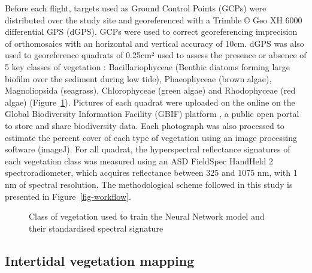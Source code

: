 \documentclass[
  number]{elsarticle}
\begin{document}
Before each flight, targets used as Ground Control Points (GCPs) were
distributed over the study site and georeferenced with a Trimble © Geo
XH 6000 differential GPS (dGPS). GCPs were used to correct
georeferencing imprecision of orthomosaics with an horizontal and
vertical accuracy of 10cm. dGPS was also used to georeference quadrats
of 0.25cm² used to assess the presence or absence of 5 key classes of
vegetation : Bacillariophyceae (Benthic diatoms forming large biofilm
over the sediment during low tide), Phaeophyceae (brown algae),
Magnoliopsida (seagrass), Chlorophyceae (green algae) and Rhodophyceae
(red algae) (Figure~\ref{fig-vegetation}). Pictures of each quadrat were
uploaded on the online on the Global Biodiversity Information Facility
(GBIF) platform \citep{BedeGbif}, a public open portal to store and
share biodiversity data. Each photograph was also processed to estimate
the percent cover of each type of vegetation using an image processing
software (imageJ). For all quadrat, the hyperspectral reflectance
signatures of each vegetation class was measured using an ASD FieldSpec
HandHeld 2 spectroradiometer, which acquires reflectance between 325 and
1075 nm, with 1 nm of spectral resolution. The methodological scheme
followed in this study is presented in Figure~\ref{fig-workflow}.

\label{cell-fig-vegetation}
\begin{figure}[H]


\caption{\label{fig-vegetation}Class of vegetation used to train the
Neural Network model and their standardised spectral signature}

\end{figure}%

\subsection{Intertidal vegetation
mapping}\label{intertidal-vegetation-mapping}
\end{document}
